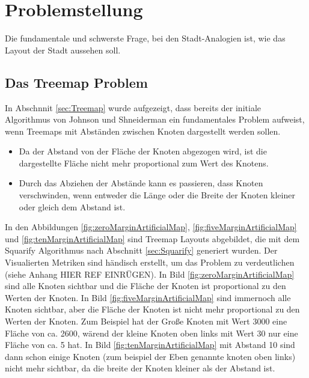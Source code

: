 \section{Problemstellung} \label{sec:Problemstellung}
Die fundamentale und schwerste Frage, bei den Stadt-Analogien ist, wie das Layout der Stadt aussehen soll.




\subsection{Das Treemap Problem} \label{sec:TreemapProblem}
In Abschnnit \ref{sec:Treemap} wurde aufgezeigt, dass bereits der initiale Algorithmus von Johnson und Shneiderman \cite{johnson1991tree} ein fundamentales Problem aufweist, wenn Treemaps mit Abständen zwischen Knoten dargestellt werden sollen. 
\begin{itemize}
    \item Da der Abstand von der Fläche der Knoten abgezogen wird, ist die dargestellte Fläche nicht mehr proportional zum Wert des Knotens.
    \item Durch das Abziehen der Abstände kann es passieren, dass Knoten verschwinden, wenn entweder die Länge oder die Breite der Knoten kleiner oder gleich dem Abstand ist.
\end{itemize}

In den Abbildungen \ref{fig:zeroMarginArtificialMap}, \ref{fig:fiveMarginArtificialMap} und \ref{fig:tenMarginArtificialMap} sind Treemap Layouts abgebildet, die mit dem Squarify Algorithmus nach Abschnitt \ref{sec:Squarify} generiert wurden. Der Visualierten Metriken sind händisch erstellt, um das Problem zu verdeutlichen (siehe Anhang HIER REF EINRÜGEN). In Bild \ref{fig:zeroMarginArtificialMap} sind alle Knoten sichtbar und die Fläche der Knoten ist proportional zu den Werten der Knoten. In Bild \ref{fig:fiveMarginArtificialMap} sind immernoch alle Knoten sichtbar, aber die Fläche der Knoten ist nicht mehr proportional zu den Werten der Knoten. Zum Beispiel hat der Große Knoten mit Wert 3000 eine Fläche von ca. 2600, wärend der kleine Knoten oben links mit Wert 30 nur eine Fläche von ca. 5 hat. In Bild \ref{fig:tenMarginArtificialMap} mit Abstand 10 sind dann schon einige Knoten (zum beispiel der Eben genannte knoten oben links) nicht mehr sichtbar, da die breite der Knoten kleiner als der Abstand ist. 


